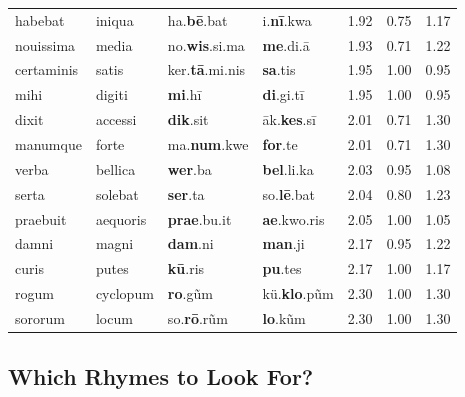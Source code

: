 \documentclass[twocolumn, switch, a4paper]{article} %
\begin{document}
\begin{table}[h!]
{\begin{tabular}{llllc@{\hspace{2\tabcolsep}}c@{\hspace{0.75\tabcolsep}}c}
       habebat &      iniqua &         ha.\textbf{bē}.bat &      i.\textbf{nī}.kwa &   1.92 &    0.75 &   1.17 \\
     nouissima &       media &       no.\textbf{wis}.si.ma &       \textbf{me}.di.ā &   1.93 &    0.71 &   1.22 \\
    certaminis &       satis &     ker.\textbf{tā}.mi.nis &         \textbf{sa}.tis &   1.95 &    1.00 &   0.95 \\
          mihi &      digiti &             \textbf{mi}.hī &      \textbf{di}.gi.tī &   1.95 &    1.00 &   0.95 \\
         dixit &     accessi &            \textbf{dik}.sit &    āk.\textbf{kes}.sī &   2.01 &    0.71 &   1.30 \\
      manumque &       forte &         ma.\textbf{num}.kwe &         \textbf{for}.te &   2.01 &    0.71 &   1.30 \\
         verba &     bellica &             \textbf{wer}.ba &      \textbf{bel}.li.ka &   2.03 &    0.95 &   1.08 \\
         serta &     solebat &             \textbf{ser}.ta &     so.\textbf{lē}.bat &   2.04 &    0.80 &   1.23 \\
      praebuit &    aequoris &         \textbf{prae}.bu.it &     \textbf{ae}.kwo.ris &   2.05 &    1.00 &   1.05 \\
         damni &       magni &             \textbf{dam}.ni &         \textbf{man}.ji &   2.17 &    0.95 &   1.22 \\
         curis &       putes &            \textbf{kū}.ris &         \textbf{pu}.tes &   2.17 &    1.00 &   1.17 \\
         rogum &    cyclopum &            \textbf{ro}.g\~{u}m &    kü.\textbf{klo}.p\~{u}m &   2.30 &    1.00 &   1.30 \\
       sororum &       locum &        so.\textbf{rō}.r\~{u}m &        \textbf{lo}.k\~{u}m &   2.30 &    1.00 &   1.30 \\
\bottomrule
\end{tabular}
}
\end{table}

\subsection{Which Rhymes to Look For?}
\label{sec:which_rhymes}
\end{document}
